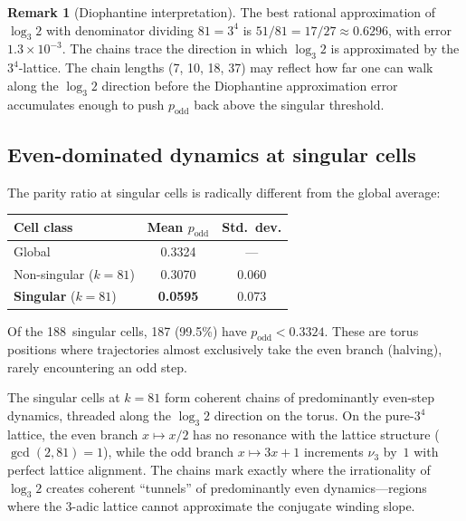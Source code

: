 \documentclass[11pt,a4paper]{article}
\theoremstyle{plain}
\theoremstyle{definition}
\newtheorem{remark}[theorem]{Remark}
\begin{document}
\begin{remark}[Diophantine interpretation]
    The best rational approximation of $\log_3 2$ with denominator
    dividing $81 = 3^4$ is $51/81 = 17/27 \approx 0.6296$, with
    error $1.3 \times 10^{-3}$.  The chains trace the direction in
    which $\log_3 2$ is approximated by the $3^4$-lattice.  The chain
    lengths (7, 10, 18, 37) may reflect how far one can walk along the
    $\log_3 2$ direction before the Diophantine approximation error
    accumulates enough to push $p_{\mathrm{odd}}$ back above the
    singular threshold.
\end{remark}


\subsection{Even-dominated dynamics at singular cells}

\begin{empirical}\label{obs:singular-podd}
    The parity ratio at singular cells is radically different from the
    global average:
    \begin{center}
    \renewcommand{\arraystretch}{1.15}
    \begin{tabular}{lcc}
        \toprule
        Cell class & Mean $p_{\mathrm{odd}}$ & Std.\ dev. \\
        \midrule
        Global & 0.3324 & --- \\
        Non-singular ($k{=}81$) & 0.3070 & 0.060 \\
        \textbf{Singular} ($k{=}81$) & \textbf{0.0595} & 0.073 \\
        \bottomrule
    \end{tabular}
    \end{center}
    Of the 188~singular cells, 187 (99.5\%) have
    $p_{\mathrm{odd}} < 0.3324$.  These are torus positions where
    trajectories almost exclusively take the even branch (halving),
    rarely encountering an odd step.
\end{empirical}

\begin{keyinsight}
    The singular cells at $k = 81$ form coherent chains of
    predominantly even-step dynamics, threaded along the $\log_3 2$
    direction on the torus.  On the pure-$3^4$ lattice, the even
    branch $x \mapsto x/2$ has no resonance with the lattice
    structure ($\gcd(2, 81) = 1$), while the odd branch
    $x \mapsto 3x + 1$ increments $\nu_3$ by~$1$ with perfect
    lattice alignment.  The chains mark exactly where the irrationality
    of $\log_3 2$ creates coherent ``tunnels'' of predominantly even
    dynamics---regions where the 3-adic lattice cannot approximate the
    conjugate winding slope.
\end{keyinsight}
\end{document}
